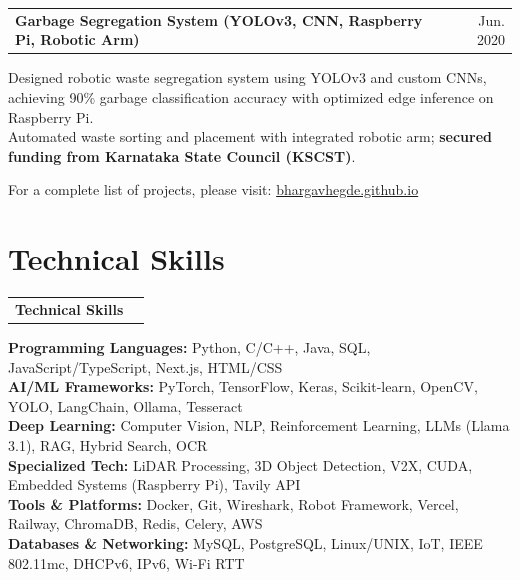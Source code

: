 \documentclass[10pt, a4paper]{article}
\makeatletter
\newenvironment{entry}[2]{
  \noindent\begin{tabularx}{\linewidth}{@{}X@{\hspace{1.5em}}r@{}}
    \textbf{#1} & #2 \\
  \end{tabularx}
  \vspace{1pt}
  \noindent\small
}{\vspace{2pt}}
\makeatother
\begin{document}
\begin{entry}{Garbage Segregation System (YOLOv3, CNN, Raspberry Pi, Robotic Arm)}{Jun. 2020}
  Designed robotic waste segregation system using YOLOv3 and custom CNNs, achieving 90\% garbage classification accuracy with optimized edge inference on Raspberry Pi. \\
  Automated waste sorting and placement with integrated robotic arm; \textbf{secured funding from Karnataka State Council (KSCST)}.
  
  \small \raggedright For a complete list of projects, please visit: \href{https://bhargavhegde.github.io/}{bhargavhegde.github.io}
\end{entry}

\section{Technical Skills}
\begin{entry}{Technical Skills}{}
  \textbf{Programming Languages:} Python, C/C++, Java, SQL, JavaScript/TypeScript, Next.js, HTML/CSS \\
  \textbf{AI/ML Frameworks:} PyTorch, TensorFlow, Keras, Scikit-learn, OpenCV, YOLO, LangChain, Ollama, Tesseract \\
  \textbf{Deep Learning:} Computer Vision, NLP, Reinforcement Learning, LLMs (Llama 3.1), RAG, Hybrid Search, OCR \\
  \textbf{Specialized Tech:} LiDAR Processing, 3D Object Detection, V2X, CUDA, Embedded Systems (Raspberry Pi), Tavily API \\
  \textbf{Tools \& Platforms:} Docker, Git, Wireshark, Robot Framework, Vercel, Railway, ChromaDB, Redis, Celery, AWS \\
  \textbf{Databases \& Networking:} MySQL, PostgreSQL, Linux/UNIX, IoT, IEEE 802.11mc, DHCPv6, IPv6, Wi-Fi RTT
\end{entry}
\end{document}
